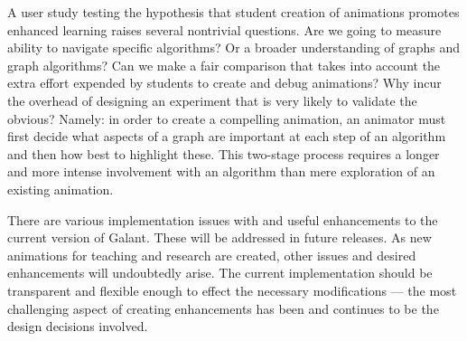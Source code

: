 A user study testing the hypothesis that student creation of animations
promotes enhanced learning raises several nontrivial questions.
Are we going to measure ability to navigate specific algorithms? Or a broader
understanding of graphs and graph algorithms?
Can we make a fair comparison that takes into account the
extra effort expended by students to create and debug animations?
Why incur the overhead of designing an experiment that is very likely to validate the obvious?
Namely:
in order to create a compelling animation,
an animator must first decide what aspects of a graph are important
at each step of an algorithm and then how best to highlight these.
This two-stage process requires a longer and more intense involvement
with an algorithm than mere exploration of an existing animation.

There are various implementation issues with and useful enhancements
to the current version of Galant.
These will be addressed in future releases.
As new animations for teaching and research
are created, other issues and desired enhancements
will undoubtedly arise.
The current implementation should be transparent and flexible enough to effect the necessary modifications --- the most challenging aspect
of creating enhancements has been and continues to be the design decisions involved.

